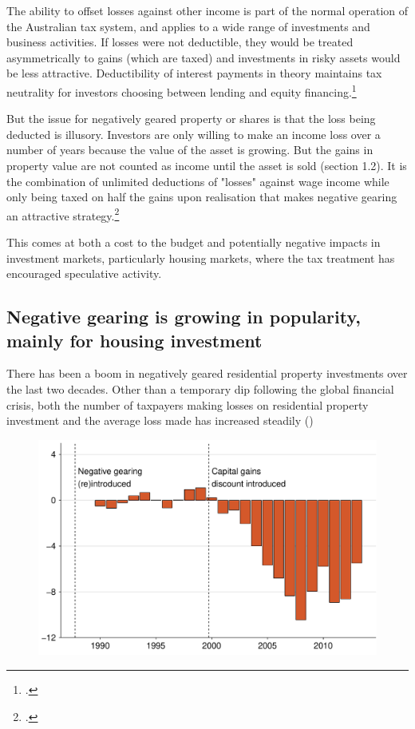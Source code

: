 \documentclass{grattan}\usepackage[]{graphicx}\usepackage[]{color}
\begin{document}
The ability to offset losses against other income is part of the normal operation of the Australian tax system, and applies to a wide range of investments and business activities. If losses were not deductible, they would be treated asymmetrically to gains (which are taxed) and investments in risky assets would be less attractive. Deductibility of interest payments in theory maintains tax neutrality for investors choosing between lending and equity financing.\footcite{Fane2004}  


But the issue for negatively geared property or shares is that the loss being deducted is illusory. Investors are only willing to make an income loss over a number of years because the value of the asset is growing. But the gains in property value are not counted as income until the asset is sold (section 1.2). It is the combination of unlimited deductions of "losses" against wage income while only being taxed on half the gains upon realisation that makes negative gearing an attractive strategy.\footcite[pages~5,13]{ACOSS} 

This comes at both a cost to the budget and potentially negative impacts in investment markets, particularly housing markets, where the tax treatment has encouraged speculative activity. 

\subsection{Negative gearing is growing in popularity, mainly for housing investment}
There has been a boom in negatively geared residential property investments over the last two decades. Other than a temporary dip following the global financial crisis, both the number of taxpayers making losses on residential property investment and the average loss made has increased steadily ()




\begin{figure}[t]
\includegraphics[width=\columnwidth]{figure/Net_rent_over_time-1}

\end{figure}
\end{document}
